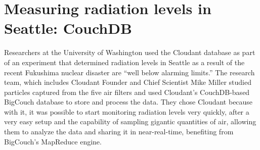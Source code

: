\section{Measuring radiation levels in Seattle: CouchDB} %
\label{sec:measuring_radiation_levels_in_seattle_couchdb}

Researchers at the University of Washington used the Cloudant  database as part of an experiment that determined radiation levels in Seattle as a result of the recent Fukushima nuclear disaster are ``well below alarming limits.'' The research team, which includes Cloudant Founder and Chief Scientist Mike Miller studied particles captured from the five air filters and used Cloudant’s CouchDB-based BigCouch database to store and process the data. They chose Cloudant because with it, it was possible to start monitoring radiation levels very quickly, after a very easy setup and the capability of sampling gigantic quantities of air, allowing them to analyze the data and sharing it in near-real-time,
benefiting from BigCouch's MapReduce engine.



